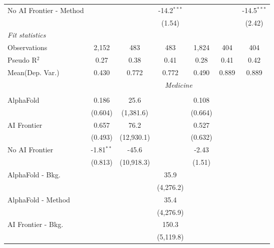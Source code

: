 \begin{tabular}{lcccccc}
   No AI Frontier - Method &               &             & -14.2$^{***}$ &               &            & -14.5$^{***}$\\   
                           &               &             & (1.54)        &               &            & (2.42)\\   
   \midrule
   \emph{Fit statistics}\\
   Observations            & 2,152         & 483         & 483           & 1,824         & 404        & 404\\  
   Pseudo R$^2$            & 0.27          & 0.38        & 0.41          & 0.28          & 0.41       & 0.42\\  
   
Mean(Dep. Var.) & 0.430 & 0.772 & 0.772 & 0.490 & 0.889 & 0.889 \\
 & \multicolumn{6}{c}{\textit{Medicine}} \\ \\
   AlphaFold               & 0.186        & 25.6       &            & 0.108   &       &   \\   
                           & (0.604)      & (1,381.6)  &            & (0.664) &       &   \\   
   AI Frontier             & 0.657        & 76.2       &            & 0.527   &       &   \\   
                           & (0.493)      & (12,930.1) &            & (0.632) &       &   \\   
   No AI Frontier          & -1.81$^{**}$ & -45.6      &            & -2.43   &       &   \\   
                           & (0.813)      & (10,918.3) &            & (1.51)  &       &   \\   
   AlphaFold - Bkg.        &              &            & 35.9       &         &       &   \\   
                           &              &            & (4,276.2)  &         &       &   \\   
   AlphaFold - Method      &              &            & 35.4       &         &       &   \\   
                           &              &            & (4,276.9)  &         &       &   \\   
   AI Frontier - Bkg.      &              &            & 150.3      &         &       &   \\   
                           &              &            & (5,119.8)  &         &       &   \\   

\end{tabular}
